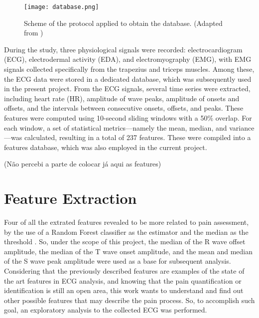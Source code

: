 \begin{figure}[h!]
    \centering
    \texttt{[image: database.png]}
    \caption{Scheme of the protocol applied to obtain the database. (Adapted from \cite{Alves2024})}
    \label{fig:database}
\end{figure}

During the study, three physiological signals were recorded: electrocardiogram (ECG), electrodermal activity (EDA), and electromyography (EMG), with EMG signals collected specifically from the trapezius and triceps muscles. Among these, the ECG data were stored in a dedicated database, which was subsequently used in the present project.
From the ECG signals, several time series were extracted, including heart rate (HR), amplitude of wave peaks, amplitude of onsets and offsets, and the intervals between consecutive onsets, offsets, and peaks. These features were computed using 10-second sliding windows with a 50\% overlap.
For each window, a set of statistical metrics—namely the mean, median, and variance—was calculated, resulting in a total of 237 features. These were compiled into a features database, which was also employed in the current project. 

(Não percebi a parte de colocar já aqui as features)




\section{Feature Extraction}
Four of all the extrated features revealed to be more related to pain assessment, by the use of a Random Forest classifier as the estimator and
the median as the threshold \cite{Alves2024}. So, under the scope of this project, the median of the R wave offset amplitude, the median of the T wave onset amplitude, and the mean and median of the S wave peak amplitude were used as a base for subsequent analysis.
Considering that the previously described features are examples of the state of the art features in ECG analysis, and knowing that the pain quantification or identification is still an open area, this work wants to understand and find out other possible features that may describe the pain process. So, to accomplish such goal, an exploratory analysis to the collected ECG was performed.



